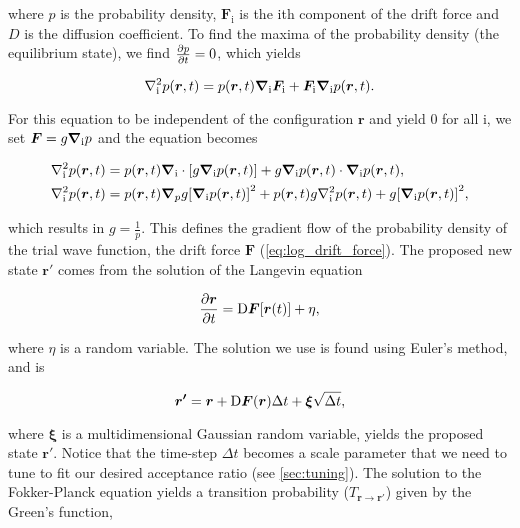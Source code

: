 where $p$ is the probability density, $\bm{F}_{\mathrm{i}}$ is the $\mathrm{i}$th component of the drift force and $D$ is the diffusion coefficient. To find the maxima of the probability density (the equilibrium state), we find $\pdv{p}{t} = 0$, which yields

\begin{equation*}
    \laplacian_{\mathrm{i}} p(\bm{r}, t) = p(\bm{r}, t)\grad_{\mathrm{i}}\bm{F}_{\mathrm{i}} + \bm{F}_{\mathrm{i}}\grad_{\mathrm{i}}p(\bm{r}, t). 
\end{equation*}

For this equation to be independent of the configuration $\bm{r}$ and yield $0$ for all $\mathrm{i}$, we set $\bm{F} = g\grad_{\mathrm{i}}p$ and the equation becomes 

\begin{align*}
    &\laplacian_{\mathrm{i}}p(\bm{r}, t) = p(\bm{r}, t)\grad_{\mathrm{i}}\cdot\qty[g\grad_{\mathrm{i}}p(\bm{r}, t)] + g\grad_{\mathrm{i}}p(\bm{r}, t)\cdot\grad_{\mathrm{i}}p(\bm{r}, t),
    \\
    &\laplacian_{\mathrm{i}}p(\bm{r}, t) = p(\bm{r}, t)\grad_{p}g\qty[\grad_{\mathrm{i}}p(\bm{r}, t)]^2 + p(\bm{r}, t)g\laplacian_{\mathrm{i}}p(\bm{r}, t) + g\qty[\grad_{\mathrm{i}}p(\bm{r}, t)]^2, 
\end{align*} 

which results in $g=\frac{1}{p}$. This defines the gradient flow of the probability density of the trial wave function, the drift force $\bm{F}$ (\autoref{eq:log_drift_force}). The proposed new state $\bm{r'}$ comes from the solution of the Langevin equation 

\begin{equation}\label{eq:langevin}
    \pdv{\bm{r}}{t} = \mathrm{D}\bm{F}\qty[\bm{r}(t)] + \eta, 
\end{equation}

where $\eta$ is a random variable. The solution we use is found using Euler's method, and is 

\begin{equation}
    \bm{r'} = \bm{r} + \mathrm{D}\bm{F}\qty(\bm{r})\Delta t + \bm{\xi}\sqrt{\Delta t},
\end{equation}

where $\bm{\xi}$ is a multidimensional Gaussian random variable, yields the proposed state $\bm{r'}$. Notice that the time-step $\Delta t$ becomes a scale parameter that we need to tune to fit our desired acceptance ratio (see \autoref{sec:tuning}). The solution to the Fokker-Planck equation yields a transition probability ($T_{\bm{r}\to\bm{r'}}$) given by the Green's function,  

